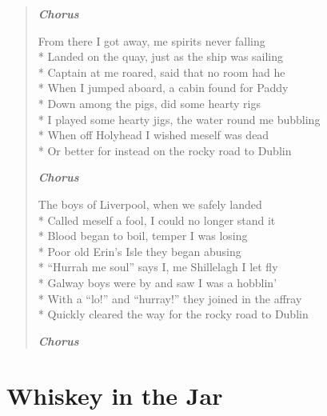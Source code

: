 \documentclass[9pt,twoside]{extarticle}
\newenvironment{xverse}{
	\begin{verse}
	\fontsize{8.5}{10.5}\selectfont
	}
	{
	\end{verse}
	\penalty 0
}
\newcommand{\chorusmark}[1][1]{%
\vspace{-0.5\stanzaskip}%
\textbf{\emph{Chorus \ifthenelse{\equal{#1}{1}}{}{$\times$ #1}}}%
\vspace{-0.5\stanzaskip}%
}
\begin{document}
\begin{xverse}
\chorusmark

From there I got away, me spirits never falling \\*
Landed on the quay, just as the ship was sailing \\*
Captain at me roared, said that no room had he \\*
When I jumped aboard, a cabin found for Paddy \\*
Down among the pigs, did some hearty rigs \\*
I played some hearty jigs, the water round me bubbling \\*
When off Holyhead I wished meself was dead \\*
Or better for instead on the rocky road to Dublin

\chorusmark

The boys of Liverpool, when we safely landed \\*
Called meself a fool, I could no longer stand it \\*
Blood began to boil, temper I was losing \\*
Poor old Erin’s Isle they began abusing \\*
“Hurrah me soul” says I, me Shillelagh I let fly \\*
Galway boys were by and saw I was a hobblin’ \\*
With a “lo!” and “hurray!” they joined in the affray \\*
Quickly cleared the way for the rocky road to Dublin

\chorusmark
\end{xverse}

\section{Whiskey in the Jar}
\end{document}
